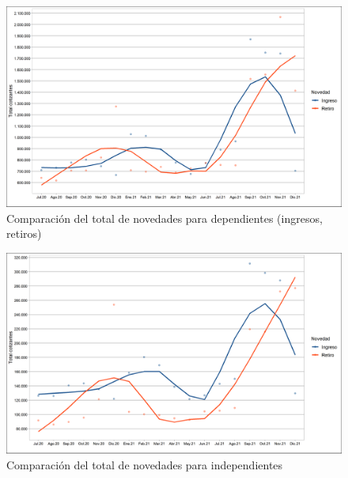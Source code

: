 \begin{figure}
\label{fig:Cap22:Novedad_1}%
\includegraphics[width = 11.5cm]{figures/01_dinamica/total_novedades_dependientes_ingret.png}
\caption{Comparación del total de novedades para dependientes (ingresos, retiros)}
\label{figura:novedad:sectorprivado:IR}
\end{figure}

\lipsum[2-4]

\begin{figure}
\label{fig:Cap22:Novedad_2}
\includegraphics[width = 11.5cm]{figures/01_dinamica/total_novedades_independientes_ingret.png}
\caption{Comparación del total de novedades para independientes}
\label{figura:novedad:sectorprivado:IR}
\end{figure}

\lipsum[2-5]

